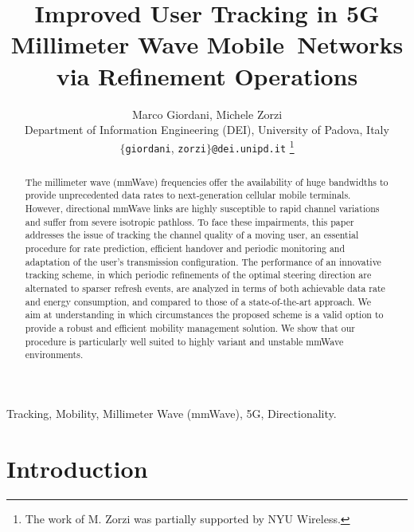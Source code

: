 \documentclass[conference]{IEEEtran}
\title{Improved User Tracking in 5G Millimeter Wave Mobile~Networks   via Refinement Operations}
\author{Marco Giordani, Michele Zorzi
\\
Department of Information Engineering (DEI), University of Padova, Italy\\
\small{$\{$\texttt{giordani}, \texttt{zorzi}$\}$\texttt{@dei.unipd.it}}
\thanks{The work of M. Zorzi was partially supported by NYU Wireless.}}
\begin{document}
\maketitle



\begin{abstract}
The millimeter wave (mmWave) frequencies offer the availability of huge bandwidths to provide unprecedented data rates to  next-generation cellular mobile terminals.
However, directional mmWave links are highly susceptible to rapid channel variations and suffer from  severe isotropic pathloss. 
To face these impairments, this paper addresses the issue of tracking the channel quality of a moving user, an essential procedure for rate prediction, efficient handover and  periodic monitoring and adaptation of the user's transmission configuration.
The performance of an innovative tracking scheme, in which periodic refinements of the optimal steering direction are alternated to sparser refresh events, are analyzed  in terms of both achievable data rate and energy consumption, and compared to those of a state-of-the-art approach.
 We aim at understanding in which circumstances the proposed scheme is a valid option to provide a robust 
and efficient mobility management solution. We show that our  procedure is particularly well suited to highly variant and unstable mmWave environments.
\end{abstract}

\begin{IEEEkeywords}
Tracking, Mobility, Millimeter Wave (mmWave), 5G, Directionality.
\end{IEEEkeywords}


\section{Introduction}
\end{document}
